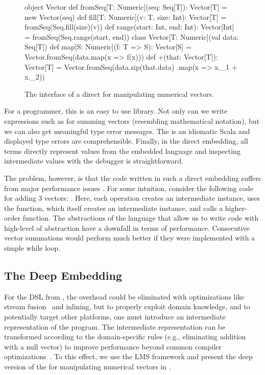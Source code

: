 \begin{figure}
\begin{listingtiny}
object Vector {
  def fromSeq[T: Numeric](seq: Seq[T]): Vector[T] =
    new Vector(seq)
  def fill[T: Numeric](v: T, size: Int): Vector[T] =
    fromSeq(Seq.fill(size)(v))
  def range(start: Int, end: Int): Vector[Int] =
    fromSeq(Seq.range(start, end))
}
class Vector[T: Numeric](val data: Seq[T]) {
  def map[S: Numeric](f: T => S): Vector[S] =
    Vector.fromSeq(data.map(x => f(x)))
  def +(that: Vector[T]): Vector[T] =
    Vector.fromSeq(data.zip(that.data)
      .map(x => x._1 + x._2))
}

\end{listingtiny}
\caption{\label{lst:vector} The interface of a direct \edsl for manipulating numerical vectors.}
\end{figure}

For a programmer, this is an easy to use library. Not only can we write
expressions such as  for summing vectors (resembling mathematical
notation), but we can also get meaningful type error messages. The \edsl is an
idiomatic Scala and displayed type errors are comprehensible. Finally, in the
direct embedding, all terms directly represent values from the embedded language
and inspecting intermediate values with the debugger is straightforward.

The problem, however, is that the code written in such a direct embedding suffers from major performance issues \cite{rompf_optimizing_2013}. For some intuition, consider the following code for adding 3 vectors: . Here, each \code{+} operation creates an intermediate  instance, uses the  function, which itself creates an intermediate  instance, and calls a higher-order  function. The abstractions of the language that allow us to write code with high-level of abstraction have a downfall in terms of performance. Consecutive vector summations would perform much better if they were implemented with a simple while loop.

\subsection{The Deep Embedding}
For the DSL from , the overhead could be eliminated with
optimizations like stream fusion~\cite{coutts_stream_2007} and inlining, but to
properly exploit domain knowledge, and to potentially target other platforms,
one must introduce an intermediate representation of the \edsl program. The
intermediate representation can be transformed according to the domain-specific rules
 (e.g., eliminating addition with a null vector) to improve performance beyond common compiler
optimizations~\cite{rompf_optimizing_2013}. To this effect, we use the LMS
framework and present the deep version of the \edsl{} for manipulating numerical vectors in
.

